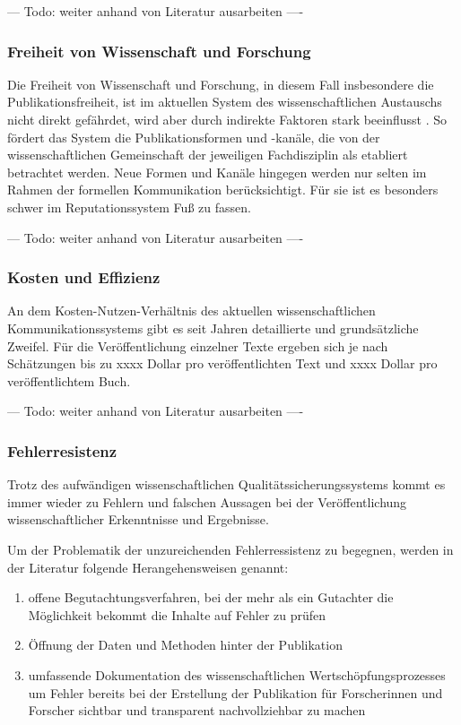 --- Todo: weiter anhand von Literatur ausarbeiten ----

\subsubsection{Freiheit von Wissenschaft und Forschung}

Die Freiheit von Wissenschaft und Forschung, in diesem Fall insbesondere die Publikationsfreiheit, ist im aktuellen System des wissenschaftlichen Austauschs nicht direkt gefährdet, wird aber durch indirekte Faktoren stark beeinflusst \cite{suchen}. So fördert das System die Publikationsformen und -kanäle, die von der wissenschaftlichen Gemeinschaft der jeweiligen Fachdisziplin als etabliert betrachtet werden. Neue Formen und Kanäle hingegen werden nur selten im Rahmen der formellen Kommunikation berücksichtigt. Für sie ist es besonders schwer im Reputationssystem Fuß zu fassen.

--- Todo: weiter anhand von Literatur ausarbeiten ----

\subsubsection{Kosten und Effizienz}

An dem Kosten-Nutzen-Verhältnis des aktuellen wissenschaftlichen Kommunikationssystems gibt es seit Jahren detaillierte und grundsätzliche Zweifel. Für die Veröffentlichung einzelner Texte ergeben sich je nach Schätzungen bis zu xxxx Dollar pro veröffentlichten Text und xxxx Dollar pro veröffentlichtem Buch.

--- Todo: weiter anhand von Literatur ausarbeiten ----

\subsubsection{Fehlerresistenz}

Trotz des aufwändigen wissenschaftlichen Qualitätssicherungssystems kommt es immer wieder zu Fehlern und falschen Aussagen bei der Veröffentlichung wissenschaftlicher Erkenntnisse und Ergebnisse.

Um der Problematik der unzureichenden Fehlerressistenz zu begegnen, werden in der Literatur folgende Herangehensweisen genannt:
\begin{enumerate}
\item offene Begutachtungsverfahren, bei der mehr als ein Gutachter die Möglichkeit bekommt die Inhalte auf Fehler zu prüfen \cite{suchen}
\item Öffnung der Daten und Methoden hinter der Publikation \cite{suchen}
\item umfassende Dokumentation des wissenschaftlichen Wertschöpfungsprozesses um Fehler bereits bei der Erstellung der Publikation für Forscherinnen und Forscher sichtbar und transparent nachvollziehbar zu machen \cite{suchen}
\end{enumerate}

